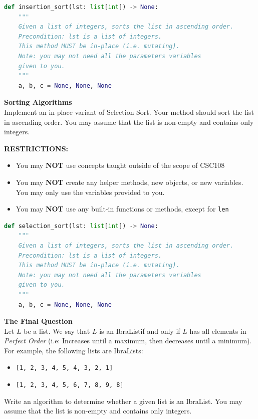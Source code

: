 \documentclass[letterpaper,13pt,addpoints]{exam}
\begin{document}
\begin{questions}
\begin{lstlisting}[language=Python, style=mystyle]
def insertion_sort(lst: list[int]) -> None:
    """
    Given a list of integers, sorts the list in ascending order.
    Precondition: lst is a list of integers.
    This method MUST be in-place (i.e. mutating).
    Note: you may not need all the parameters variables
    given to you.
    """
    a, b, c = None, None, None
    \end{lstlisting}
\clearpage
\question[10] \textbf{Sorting Algorithms} \\
Implement an in-place variant of Selection Sort. Your method should sort the list in ascending order. You may assume that the list is non-empty and contains only integers.
\begin{center}
    \textbf{RESTRICTIONS:}
    \begin{itemize}
        \item You may \textbf{NOT} use concepts taught outside of the scope of CSC108
        \item You may \textbf{NOT} create any helper methods, new objects, or new variables.
              You may only use the variables provided to you.
        \item You may \textbf{NOT} use any built-in functions or methods, except for
              \texttt{len}
    \end{itemize}
\end{center}
\begin{lstlisting}[language=Python, style=mystyle]
def selection_sort(lst: list[int]) -> None:
    """
    Given a list of integers, sorts the list in ascending order.
    Precondition: lst is a list of integers.
    This method MUST be in-place (i.e. mutating).
    Note: you may not need all the parameters variables
    given to you.
    """
    a, b, c = None, None, None
\end{lstlisting}
\clearpage
\question[10] \textbf{The Final Question} \\
Let $L$ be a list. We say that $L$ is an IbraList\texttrademark if and only if $L$ has all elements in \textit{Perfect Order} (i.e: Increases until a maximum, then decreases until a minimum). For example, the following lists are IbraLists:
\begin{itemize}
    \item \texttt{[1, 2, 3, 4, 5, 4, 3, 2, 1]}
    \item \texttt{[1, 2, 3, 4, 5, 6, 7, 8, 9, 8]}
\end{itemize}
Write an algorithm to determine whether a given list is an IbraList\texttrademark. You may assume that the list is non-empty and contains only integers.

\end{questions}
\end{document}
